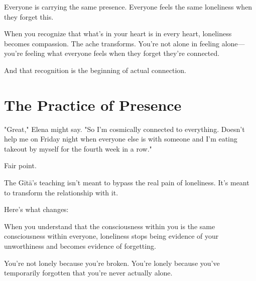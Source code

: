 \documentclass[11pt,twoside]{book}
\begin{document}
Everyone is carrying the same presence. Everyone feels the same loneliness when they forget this.

When you recognize that what's in your heart is in every heart, loneliness becomes compassion. The ache transforms. You're not alone in feeling alone—you're feeling what everyone feels when they forget they're connected.

And that recognition is the beginning of actual connection.

\section*{The Practice of Presence}

"Great," Elena might say. "So I'm cosmically connected to everything. Doesn't help me on Friday night when everyone else is with someone and I'm eating takeout by myself for the fourth week in a row."

Fair point.

The Gītā's teaching isn't meant to bypass the real pain of loneliness. It's meant to transform the relationship with it.

Here's what changes:

When you understand that the consciousness within you is the same consciousness within everyone, loneliness stops being evidence of your unworthiness and becomes evidence of forgetting.

You're not lonely because you're broken. You're lonely because you've temporarily forgotten that you're never actually alone.
\end{document}

